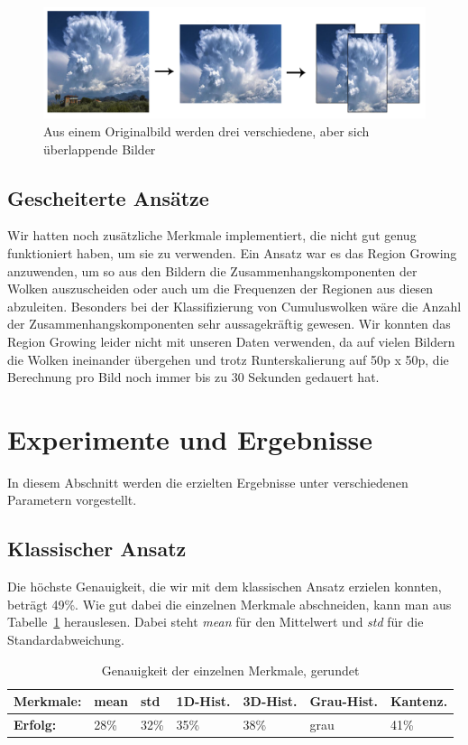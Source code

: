 \documentclass[a4,german]{article}
\begin{document}
\begin{figure}[h!]
\centering
\includegraphics[width=\textwidth]{Augmentation}
\caption{Aus einem Originalbild werden drei verschiedene, aber sich überlappende Bilder}
    \label{fig:augmentation}
\end{figure}


\subsection{Gescheiterte Ansätze}
Wir hatten noch zusätzliche Merkmale implementiert, die nicht gut genug funktioniert haben, um sie zu verwenden.
Ein Ansatz war es das Region Growing anzuwenden, um so aus den Bildern die Zusammenhangskomponenten der Wolken auszuscheiden oder auch um die Frequenzen der Regionen aus diesen abzuleiten.
Besonders bei der Klassifizierung von Cumuluswolken %
wäre die Anzahl der Zusammenhangskomponenten sehr aussagekräftig gewesen.
Wir konnten das Region Growing leider nicht mit unseren Daten verwenden, da auf vielen Bildern die Wolken ineinander übergehen und trotz Runterskalierung auf 50p x 50p, die Berechnung pro Bild noch immer bis zu 30 Sekunden gedauert hat.


\section{Experimente und Ergebnisse}
\label{sec:experimente}
In diesem Abschnitt werden die erzielten Ergebnisse unter verschiedenen Parametern vorgestellt.

\subsection{Klassischer Ansatz}%
Die höchste Genauigkeit, die wir mit dem klassischen Ansatz erzielen konnten, beträgt 49\%. Wie gut dabei die einzelnen Merkmale abschneiden, kann man aus Tabelle~\ref{tab:gen} herauslesen. Dabei steht \textit{mean} für den Mittelwert und \textit{std} für die Standardabweichung. 
\begin{table}[h]
\begin{tabular}{|l|l|l|l|l|l|l|}
 \hline
 \textbf{Merkmale:}&mean&std&1D-Hist.&3D-Hist.&Grau-Hist.&Kantenz.\\
 \hline
 \textbf{Erfolg:} & 28\% & 32\% & 35\% & 38\% & grau & 41\% \\
 \hline
\end{tabular}
\caption{Genauigkeit der einzelnen Merkmale, gerundet}
\label{tab:gen}
\end{table}
\end{document}
